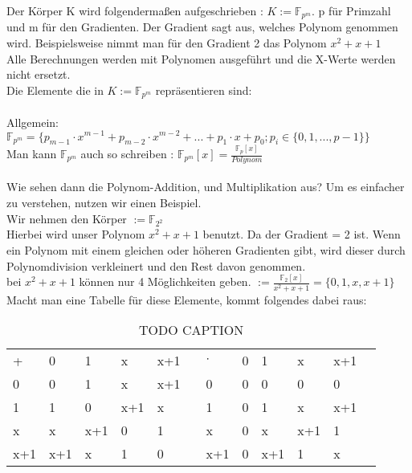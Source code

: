 Der Körper K wird folgendermaßen aufgeschrieben : $ K := \mathbb{F}_{p^m}$. p für Primzahl und m für den Gradienten. Der Gradient sagt aus, welches Polynom genommen wird. 
Beispielsweise nimmt man für den Gradient 2 das Polynom $x^2 + x + 1$\\
Alle Berechnungen werden mit Polynomen ausgeführt und die X-Werte werden nicht ersetzt.
\\
Die Elemente die in $ K := \mathbb{F}_{p^m}$ repräsentieren sind:\\
\\
Allgemein: $  \mathbb{F}_{p^m} = \{p_{m-1} \cdot x^{m-1} + p_{m-2} \cdot x^{m-2} + ... + p_1 \cdot x + p_0 ; p_i \in \{0,1,..., p-1\} \}$\\
Man kann $\mathbb{F}_{p^m}$ auch so schreiben : $\mathbb{F}_{p^m}[x] = \frac{\mathbb{F}_{p}[x]}{Polynom} $\\
\\
Wie sehen dann die Polynom-Addition, und Multiplikation aus? Um es einfacher zu verstehen, nutzen wir einen Beispiel.
\\
Wir nehmen den Körper $ := \mathbb{F}_{2^2}$
\\
Hierbei wird unser Polynom $ x^2+ x + 1 $ benutzt. Da der Gradient = 2 ist. Wenn ein Polynom mit einem gleichen oder höheren Gradienten gibt, wird dieser durch Polynomdivision verkleinert und den Rest davon genommen.\\
bei $ x^2+ x + 1 $ können nur 4 Möglichkeiten geben. $ := \frac{\mathbb{F}_{2}[x]}{x^2+ x + 1} = \{0, 1, x, x+1\}$\\

Macht man eine Tabelle für diese Elemente, kommt folgendes dabei raus:

\begin{table}[h]\caption{TODO CAPTION}
    \begin{tabular}{l|l|l|l|lll|l|l|l|ll}
    +   & 0   & 1   & x   & x+1 &  & $\cdot$   & 0 & 1   & x   & x+1 &  \\ \cline{1-5} \cline{7-11}
    0   & 0   & 1   & x   & x+1 &  & 0   & 0 & 0   & 0   & 0   &  \\ \cline{1-5} \cline{7-11}
    1   & 1   & 0   & x+1 & x   &  & 1   & 0 & 1   & x   & x+1 &  \\ \cline{1-5} \cline{7-11}
    x   & x   & x+1 & 0   & 1   &  & x   & 0 & x   & x+1 & 1   &  \\ \cline{1-5} \cline{7-11}
    x+1 & x+1 & x   & 1   & 0   &  & x+1 & 0 & x+1 & 1   & x   & 
    \end{tabular}
\end{table}



